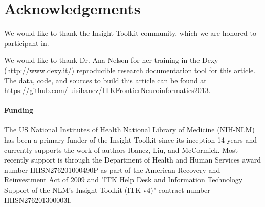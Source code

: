 \documentclass{frontiersENG} %
\begin{document}
\section*{Acknowledgements}

We would like to thank the Insight Toolkit community, which we are honored to
participant in.

We would like to thank Dr. Ana Nelson for her training in the Dexy
(\url{http://www.dexy.it/}) reproducible research documentation tool for this
article.  The data, code, and sources to build this article can be found at
\url{https://github.com/luisibanez/ITKFrontierNeuroinformatics2013}.

\paragraph{Funding\textcolon} The US National Institutes of Health National
Library of Medicine (NIH-NLM) has been a primary funder of the Insight Toolkit since
its inception 14 years and currently supports the work of authors Ibanez, Liu,
and McCormick. Most recently support is through the Department of Health and Human
Services award number HHSN276201000490P as part of the American Recovery and
Reinvestment Act of 2009 and "ITK Help Desk and Information Technology Support
of the NLM's Insight Toolkit (ITK-v4)" contract number HHSN276201300003I.


















\end{document}
